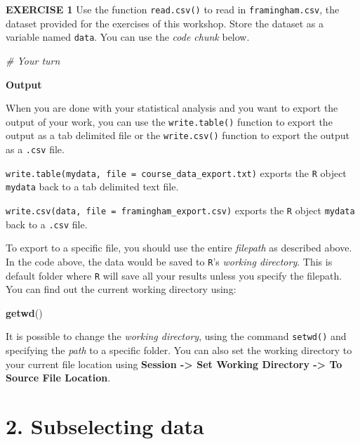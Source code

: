 \documentclass[
]{article}
\newenvironment{Shaded}{\begin{snugshade}}{\end{snugshade}}
\newcommand{\CommentTok}[1]{\textcolor[rgb]{0.56,0.35,0.01}{\textit{#1}}}
\newcommand{\KeywordTok}[1]{\textcolor[rgb]{0.13,0.29,0.53}{\textbf{#1}}}
\newcommand{\NormalTok}[1]{#1}
\begin{document}
\textbf{EXERCISE 1} Use the function \texttt{read.csv()} to read in
\texttt{framingham.csv}, the dataset provided for the exercises of this
workshop. Store the dataset as a variable named \texttt{data}. You can
use the \emph{code chunk} below.

\begin{Shaded}
\begin{Highlighting}[]
\CommentTok{# Your turn}
\end{Highlighting}
\end{Shaded}

\textbf{Output}

When you are done with your statistical analysis and you want to export
the output of your work, you can use the \texttt{write.table()} function
to export the output as a tab delimited file or the \texttt{write.csv()}
function to export the output as a \texttt{.csv} file.

\texttt{write.table(mydata,\ file\ =\ \textquotesingle{}course\_data\_export.txt\textquotesingle{})}
exports the \texttt{R} object \texttt{mydata} back to a tab delimited
text file.

\texttt{write.csv(data,\ file\ =\ \textquotesingle{}framingham\_export.csv\textquotesingle{})}
exports the \texttt{R} object \texttt{mydata} back to a \texttt{.csv}
file.

To export to a specific file, you should use the entire \emph{filepath}
as described above. In the code above, the data would be saved to
\texttt{R}'s \emph{working directory}. This is default folder where
\texttt{R} will save all your results unless you specify the filepath.
You can find out the current working directory using:

\begin{Shaded}
\begin{Highlighting}[]
\KeywordTok{getwd}\NormalTok{()}
\end{Highlighting}
\end{Shaded}

It is possible to change the \emph{working directory}, using the command
\texttt{setwd()} and specifying the \emph{path} to a specific folder.
You can also set the working directory to your current file location
using \textbf{Session -\textgreater{} Set Working Directory
-\textgreater{} To Source File Location}.

\hypertarget{subselecting-data}{%
\section{2. Subselecting data}\label{subselecting-data}}
\end{document}
